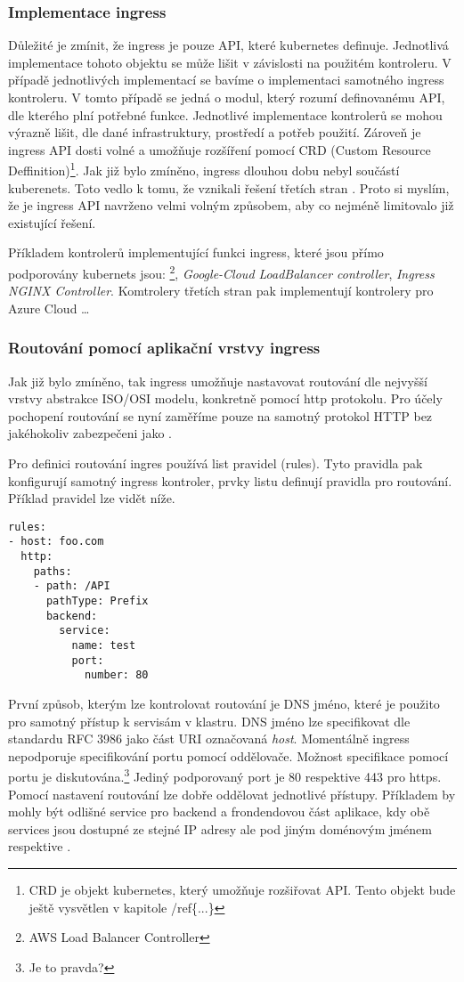 \subsubsection{Implementace ingress}
Důležité je zmínit, že ingress je pouze API, které kubernetes definuje. Jednotlivá implementace tohoto objektu se může lišit v závislosti na použitém kontroleru. V případě jednotlivých implementací se bavíme o implementaci samotného ingress kontroleru. V tomto případě se jedná o modul, který rozumí definovanému API, dle kterého plní potřebné funkce. Jednotlivé implementace kontrolerů se mohou výrazně lišit, dle dané infrastruktury, prostředí a potřeb použití. Zároveň je ingress API dosti volné a umožňuje rozšíření pomocí CRD (Custom Resource Deffinition)\footnote{CRD je objekt kubernetes, který umožňuje rozšiřovat API. Tento objekt bude ještě vysvětlen v kapitole /ref\{...\}}. Jak již bylo zmíněno, ingress dlouhou dobu nebyl součástí kuberenets. Toto vedlo k tomu, že vznikali řešení třetích stran \cite{kashin_2021_gateway}. Proto si myslím, že je ingress API navrženo velmi volným způsobem, aby co nejméně limitovalo již existující řešení.

Příkladem kontrolerů implementující funkci ingress, které jsou přímo podporovány kubernets  jsou: \footnote{AWS Load Balancer Controller}, \textit{Google-Cloud LoadBalancer controller}, \textit{Ingress NGINX Controller}. Komtrolery třetích stran pak implementují kontrolery pro Azure Cloud \ldots

\subsubsection{Routování pomocí aplikační vrstvy ingress}
Jak již bylo zmíněno, tak ingress umožňuje nastavovat routování dle nejvyšší vrstvy abstrakce ISO/OSI modelu, konkretně pomocí http protokolu. Pro účely pochopení routování se nyní zaměříme pouze na samotný protokol HTTP bez jakéhokoliv zabezpečeni jako .

Pro definici routování ingres používá list pravidel (rules). Tyto pravidla pak konfigurují samotný ingress kontroler, prvky listu definují pravidla pro routování. Příklad pravidel lze vidět níže.
\begin{verbatim}
rules:
- host: foo.com
  http:
    paths:
    - path: /API
      pathType: Prefix
      backend:
        service:
          name: test
          port: 
            number: 80
\end{verbatim}
První způsob, kterým lze kontrolovat routování je DNS jméno, které je použito pro samotný přístup k servisám v klastru. DNS jméno lze specifikovat dle standardu RFC 3986 jako část URI označovaná \textit{host}. Momentálně ingress nepodporuje specifikování portu pomocí \term{:} oddělovače. Možnost specifikace pomocí portu je diskutována.\footnote{Je to pravda?}  Jediný podporovaný port je 80 respektive 443 pro https. Pomocí nastavení routování lze dobře oddělovat jednotlivé přístupy. Příkladem by mohly být odlišné service pro backend a frondendovou část aplikace, kdy obě services jsou dostupné ze stejné IP adresy ale pod jiným doménovým jménem  respektive .

